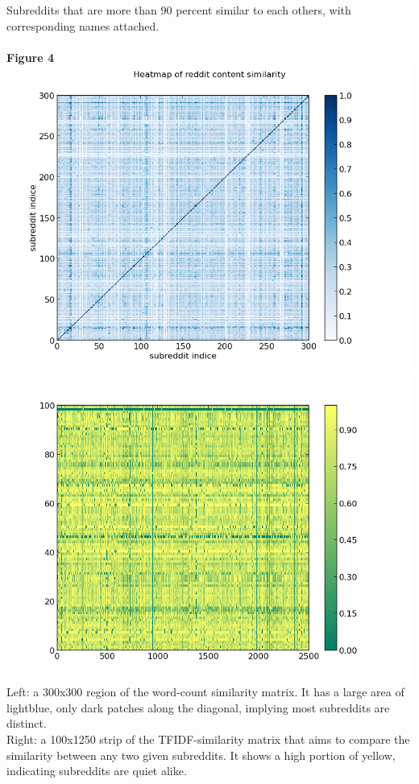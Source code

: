 \documentclass[10pt]{article}
\begin{document}
Subreddits that are more than 90 percent similar to each others, with corresponding names attached.\\ 
\pagebreak\\
\textbf{Figure 4}\\
\includegraphics[scale=0.45]{HeatmapContent} \includegraphics[scale=0.45]{TF100.png}\\
Left: a 300x300 region of the word-count similarity matrix. It has a large area of lightblue, only dark patches along the diagonal, implying most subreddits are distinct.\\
\linebreak
Right: a 100x1250 strip of the TFIDF-similarity matrix that aims to compare the similarity between any two given subreddits. It shows a high portion of yellow, indicating subreddits are quiet alike.\\
\end{document}
